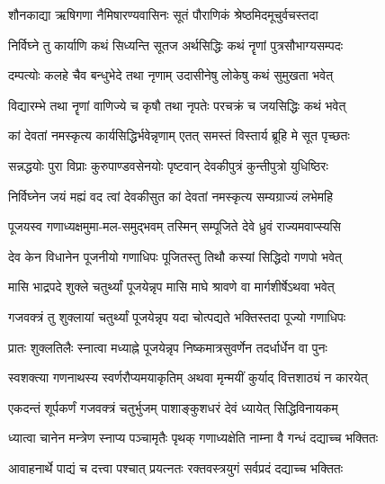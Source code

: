 
\twolineshloka
{शौनकाद्या ऋषिगणा नैमिषारण्यवासिनः}
{सूतं पौराणिकं श्रेष्ठमिदमूचुर्वचस्तदा}%


\twolineshloka
{निर्विघ्ने तु कार्याणि कथं सिध्यन्ति सूतज}
{अर्थसिद्धिः कथं नॄणां पुत्रसौभाग्यसम्पदः}%

\twolineshloka
{दम्पत्योः कलहे चैव बन्धुभेदे तथा नृणाम्}
{उदासीनेषु लोकेषु कथं सुमुखता भवेत्}%

\twolineshloka
{विद्यारम्भे तथा नॄणां वाणिज्ये च कृषौ तथा}
{नृपतेः परचक्रं च जयसिद्धिः कथं भवेत्}%

\twolineshloka
{कां देवतां नमस्कृत्य कार्यसिद्धिर्भवेन्नृणाम्}
{एतत् समस्तं विस्तार्य ब्रूहि मे सूत पृच्छतः}%

\twolineshloka
{सन्नद्धयोः पुरा विप्राः कुरुपाण्डवसेनयोः}
{पृष्टवान् देवकीपुत्रं कुन्तीपुत्रो युधिष्ठिरः}%


\twolineshloka
{निर्विघ्नेन जयं मह्यं वद त्वां देवकीसुत}
{कां देवतां नमस्कृत्य सम्यग्राज्यं लभेमहि}%


\twolineshloka
{पूजयस्व गणाध्यक्षमुमा-मल-समुद्भवम्}
{तस्मिन् सम्पूजिते देवे ध्रुवं राज्यमवाप्स्यसि}%


\twolineshloka
{देव केन विधानेन पूजनीयो गणाधिपः}
{पूजितस्तु तिथौ कस्यां सिद्धिदो गणपो भवेत्}%


\twolineshloka
{मासि भाद्रपदे शुक्ले चतुर्थ्यां पूजयेन्नृप}
{मासि माघे श्रावणे वा मार्गशीर्षेऽथवा भवेत्}%

\twolineshloka
{गजवक्त्रं तु शुक्लायां चतुर्थ्यां पूजयेन्नृप}
{यदा चोत्पद्यते भक्तिस्तदा पूज्यो गणाधिपः}%

\twolineshloka
{प्रातः शुक्लतिलैः स्नात्वा मध्याह्ने पूजयेन्नृप}
{निष्कमात्रसुवर्णेन तदर्धार्धेन वा पुनः}%

\twolineshloka
{स्वशक्त्या गणनाथस्य स्वर्णरौप्यमयाकृतिम्}
{अथवा मृन्मयीं कुर्याद् वित्तशाठ्यं न कारयेत्}%

\twolineshloka
{एकदन्तं शूर्पकर्णं गजवक्त्रं चतुर्भुजम्}
{पाशाङ्कुशधरं देवं ध्यायेत् सिद्धिविनायकम्}%

\twolineshloka
{ध्यात्वा चानेन मन्त्रेण स्नाप्य पञ्चामृतैः पृथक्}
{गणाध्यक्षेति नाम्ना वै गन्धं दद्याच्च भक्तितः}%

\twolineshloka
{आवाहनार्थे पाद्यं च दत्त्वा पश्चात् प्रयत्नतः}
{रक्तवस्त्रयुगं सर्वप्रदं दद्याच्च भक्तितः}%

